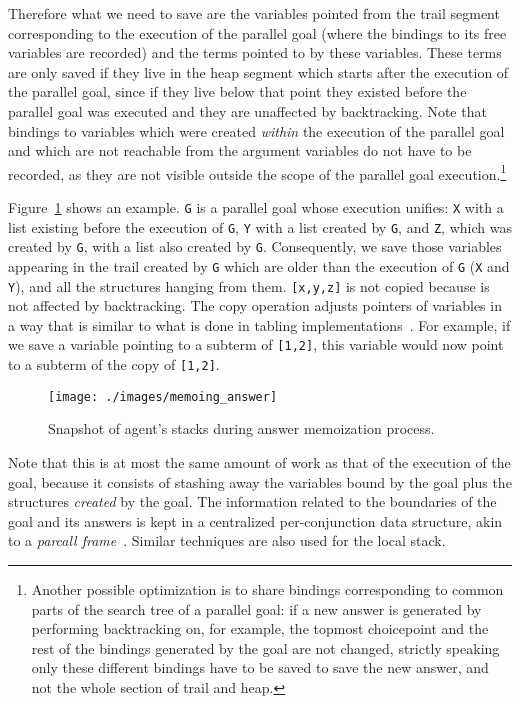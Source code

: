 \documentclass{tlp}
\newcommand{\compressfigure}{\vspace{-1em}}
\begin{document}
 Therefore what we need to save are the variables pointed from the
 trail segment corresponding to the execution of the parallel goal
 (where the bindings to its free variables are recorded) and the terms
 pointed to by these variables. These terms are only saved if they
 live in the heap segment which starts after the execution of the
 parallel goal, since if they live below that point they existed
 before the parallel goal was executed and they are unaffected by
 backtracking.
Note that bindings to variables which were created \emph{within} the
 execution of the parallel goal and which are not reachable from the
 argument variables do not have to be recorded, as they are not
 visible outside the scope of the parallel goal
 execution.\footnote{Another possible optimization
is to share bindings corresponding to common parts of the search
  tree of a parallel goal: if a new answer is generated by performing
  backtracking on, for example, the topmost choicepoint and the rest
  of the bindings generated by the goal are not changed, strictly
  speaking only these different bindings have to be saved to save the
  new answer, and not the whole section of trail and heap.}  

Figure~\ref{fig:answer_memo} shows an example. \lstinline{G} is a
parallel goal whose execution unifies: \lstinline{X} with a list
existing before the execution of \lstinline{G}, \lstinline{Y} with a
list created by \lstinline{G}, and \lstinline{Z}, which was created by
\lstinline{G}, with a list also created by
\lstinline{G}. Consequently, we save those variables appearing in the
trail created by \lstinline{G} which are older than the execution of
\lstinline{G} (\lstinline{X} and \lstinline{Y}), and all the
structures hanging from them. \lstinline{[x,y,z]} is not copied
because is not affected by backtracking. The copy operation adjusts
pointers of variables in a way that is similar to what is done in tabling
implementations~\cite{rama95:efficient_tabling}. For example, if we
save a variable pointing to a subterm of \lstinline{[1,2]}, this
variable would now point to a subterm of the copy of
\lstinline{[1,2]}.


\begin{figure}[tb]
  \centering\texttt{[image: ./images/memoing\_answer]}
  \caption{Snapshot of agent's stacks during answer memoization process.}
  \label{fig:answer_memo}
  \compressfigure
\end{figure}

Note that this is at most the same amount of work as that of the
execution of the goal, because it consists of stashing away the
variables bound by the goal plus the structures \emph{created} by the
goal. The information related to the boundaries of the goal and
its answers is kept in a centralized per-conjunction data structure,
akin to a \emph{parcall frame}~\cite{ngc-and-prolog}. Similar
techniques are also used for the local stack.
\end{document}
